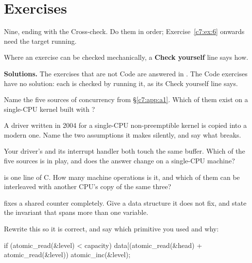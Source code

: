 
\section{Exercises}
\label{c7:sec:exercises}\label{c7:app:c}

\begin{aside}
Nine, ending with the Cross-check. Do them in order; Exercise~\ref{c7:ex:6} onwards need the target
running.

Where an exercise can be checked mechanically, a \textbf{Check yourself} line says how.

\textbf{Solutions.} The exercises that are not Code are answered in . The Code
exercises have no solution: each is checked by running it, as its Check yourself line says.
\end{aside}

\label{c7:ex:1}

 Name the five sources of concurrency from \S\ref{c7:app:a1}. Which of them exist on a
single-CPU kernel built with ?

 A driver written in 2004 for a single-CPU non-preemptible kernel is copied into a modern
one. Name the two assumptions it makes silently, and say what breaks.

 Your driver's  and its interrupt handler both touch the same buffer. Which of
the five sources is in play, and does the answer change on a single-CPU machine?

  is one line of C. How many machine operations is it, and which of them
can be interleaved with another CPU's copy of the same three?

\label{c7:ex:2}

  fixes a shared counter completely. Give a data structure it does not
fix, and state the invariant that spans more than one variable.

 Rewrite this so it is correct, and say which primitive you used and why:

\begin{ccode}
if (atomic_read(&level) < capacity) {
        data[(atomic_read(&head) + atomic_read(&level)) %
        atomic_inc(&level);
}
\end{ccode}

